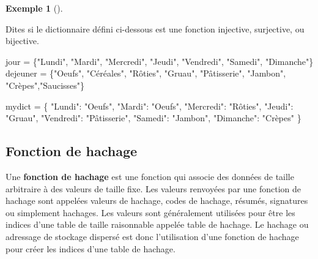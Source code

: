 \documentclass[
  letterpaper,
]{scrbook}
\newenvironment{Shaded}{\begin{snugshade}}{\end{snugshade}}
\newcommand{\NormalTok}[1]{\textcolor[rgb]{0.00,0.44,0.13}{#1}}
\newcommand{\OperatorTok}[1]{\textcolor[rgb]{0.40,0.40,0.40}{#1}}
\newcommand{\StringTok}[1]{\textcolor[rgb]{0.25,0.44,0.63}{#1}}
\theoremstyle{plain}
\theoremstyle{definition}
\theoremstyle{definition}
\newtheorem{example}{Exemple}[chapter]
\theoremstyle{remark}
\begin{document}
\begin{example}[]\protect\hypertarget{exm-jour-dejeuner-non-injective}{}\label{exm-jour-dejeuner-non-injective}

Dites si le dictionnaire défini ci-dessous est une fonction injective,
surjective, ou bijective.

\hypertarget{dictionnaries-days-breakfast-non-injective}{}
\begin{Shaded}
\begin{Highlighting}[]
\NormalTok{jour }\OperatorTok{=}\NormalTok{ \{}\StringTok{"Lundi"}\NormalTok{, }\StringTok{"Mardi"}\NormalTok{, }\StringTok{"Mercredi"}\NormalTok{, }\StringTok{"Jeudi"}\NormalTok{, }\StringTok{"Vendredi"}\NormalTok{, }\StringTok{"Samedi"}\NormalTok{, }\StringTok{"Dimanche"}\NormalTok{\}}
\NormalTok{dejeuner }\OperatorTok{=}\NormalTok{ \{}\StringTok{"Oeufs"}\NormalTok{, }\StringTok{"Céréales"}\NormalTok{, }\StringTok{"Rôties"}\NormalTok{, }\StringTok{"Gruau"}\NormalTok{, }\StringTok{"Pâtisserie"}\NormalTok{, }\StringTok{"Jambon"}\NormalTok{, }\StringTok{"Crèpes"}\NormalTok{,}\StringTok{"Saucisses"}\NormalTok{\}}

\NormalTok{mydict }\OperatorTok{=}\NormalTok{ \{}
    \StringTok{"Lundi"}\NormalTok{: }\StringTok{"Oeufs"}\NormalTok{,}
    \StringTok{"Mardi"}\NormalTok{: }\StringTok{"Oeufs"}\NormalTok{,}
    \StringTok{"Mercredi"}\NormalTok{: }\StringTok{"Rôties"}\NormalTok{,}
    \StringTok{"Jeudi"}\NormalTok{: }\StringTok{"Gruau"}\NormalTok{,}
    \StringTok{"Vendredi"}\NormalTok{: }\StringTok{"Pâtisserie"}\NormalTok{,}
    \StringTok{"Samedi"}\NormalTok{: }\StringTok{"Jambon"}\NormalTok{,}
    \StringTok{"Dimanche"}\NormalTok{: }\StringTok{"Crèpes"}
\NormalTok{\}}
\end{Highlighting}
\end{Shaded}

\end{example}

\hypertarget{fonction-de-hachage}{%
\subsection{Fonction de hachage}\label{fonction-de-hachage}}

Une \textbf{fonction de hachage} est une fonction qui associe des
données de taille arbitraire à des valeurs de taille fixe. Les valeurs
renvoyées par une fonction de hachage sont appelées valeurs de hachage,
codes de hachage, résumés, signatures ou simplement hachages. Les
valeurs sont généralement utilisées pour être les indices d'une table de
taille raisonnable appelée table de hachage. Le hachage ou adressage de
stockage dispersé est donc l'utilisation d'une fonction de hachage pour
créer les indices d'une table de hachage.
\end{document}
